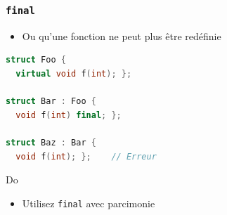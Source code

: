 \documentclass[C++.tex]{subfiles}
\begin{document}
\begin{frame}[fragile]
	\frametitle{\lstinline|final|}
	\begin{itemize}
		\item Ou qu'une fonction ne peut plus être redéfinie
	\end{itemize}

	\begin{lstlisting}[language=C++]
struct Foo {
  virtual void f(int); };

struct Bar : Foo {
  void f(int) final; };

struct Baz : Bar {
  void f(int); };    // Erreur\end{lstlisting}

	\begin{exampleblock}{Do}
		\begin{itemize}
			\item Utilisez \lstinline|final| avec parcimonie
		\end{itemize}
	\end{exampleblock}


\end{frame}
\end{document}
